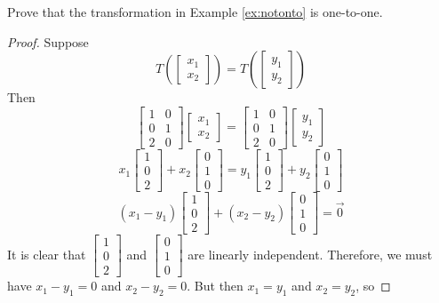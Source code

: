 \documentclass{ximera}
\begin{document}
\begin{example}\label{ex:notontoisonetoone}
Prove that the transformation in Example \ref{ex:notonto} is one-to-one.
\begin{proof}
Suppose
$$T\left(\begin{bmatrix}x_1\\x_2\end{bmatrix}\right)=T\left(\begin{bmatrix}y_1\\y_2\end{bmatrix}\right)$$
Then
$$\begin{bmatrix}1&0\\0&1\\2&0\end{bmatrix}\begin{bmatrix}x_1\\x_2\end{bmatrix}=\begin{bmatrix}1&0\\0&1\\2&0\end{bmatrix}\begin{bmatrix}y_1\\y_2\end{bmatrix}$$
$$x_1\begin{bmatrix}1\\0\\2\end{bmatrix}+x_2\begin{bmatrix}0\\1\\0\end{bmatrix}=y_1\begin{bmatrix}1\\0\\2\end{bmatrix}+y_2\begin{bmatrix}0\\1\\0\end{bmatrix}$$
$$(x_1-y_1)\begin{bmatrix}1\\0\\2\end{bmatrix}+(x_2-y_2)\begin{bmatrix}0\\1\\0\end{bmatrix}=\vec{0}$$
It is clear that $\begin{bmatrix}1\\0\\2\end{bmatrix}$ and $\begin{bmatrix}0\\1\\0\end{bmatrix}$ are linearly independent.  Therefore, we must have $x_1-y_1=0$ and $x_2-y_2=0$.  But then $x_1=y_1$ and $x_2=y_2$, so 

\end{proof}
\end{example}
\end{document}
